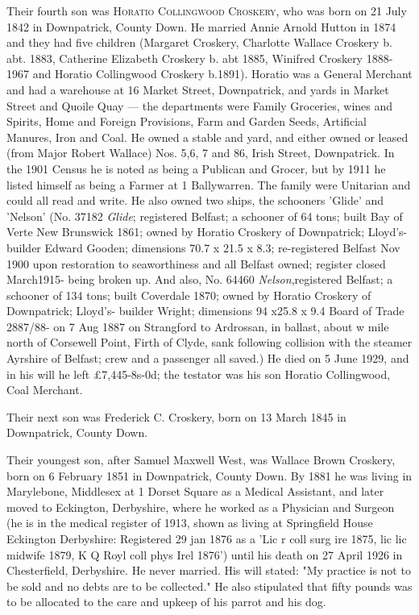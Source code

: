 Their fourth son was \textsc{Horatio Collingwood Croskery}, who was born on	21 July 1842 in Downpatrick, County Down. He married Annie Arnold Hutton in 1874 and they had five children (Margaret Croskery, Charlotte Wallace Croskery b. abt. 1883, 
Catherine Elizabeth Croskery b. abt 1885, Winifred Croskery 1888-1967 and Horatio Collingwood Croskery b.1891).  Horatio was a General Merchant and had a warehouse at 16 Market Street, Downpatrick, and yards in Market Street and Quoile Quay — the departments were Family Groceries, wines and Spirits, Home and Foreign Provisions, Farm and Garden Seeds, Artificial Manures, Iron and Coal. He owned a stable and yard, and either owned or leased (from Major Robert Wallace) Nos. 5,6, 7 and 86, Irish Street, Downpatrick. In the 1901 Census he is noted as being a Publican and Grocer, but by 1911 he listed himself as being a Farmer at 1 Ballywarren. The family were Unitarian and could all read and write. He also owned two ships, the schooners 'Glide' and 'Nelson' (No. 37182 \textit{Glide}; registered Belfast; a schooner of 64 tons; built Bay of Verte New Brunswick 1861; owned by Horatio Croskery of Downpatrick; Lloyd’s- builder Edward Gooden; dimensions 70.7 x 21.5 x 8.3; re-registered Belfast Nov 1900 upon restoration to seaworthiness and all Belfast owned; register closed March1915- being broken up. And also, No. 64460 \textit{Nelson},registered Belfast; a schooner of 134 tons; built Coverdale 1870; owned by Horatio Croskery of Downpatrick; Lloyd’s- builder Wright; dimensions 94 x25.8 x 9.4 Board of Trade 2887/88- on 7 Aug 1887 on Strangford to Ardrossan, in ballast, about w mile north of Corsewell Point, Firth of Clyde, sank following collision with the steamer Ayrshire of Belfast; crew and a passenger all saved.)   He died on 5 June 1929, and in his will he left £7,445-8s-0d; the testator was his son Horatio Collingwood, Coal Merchant. 

Their next son was Frederick C. Croskery, born on 13 March 1845 in Downpatrick, County Down.

Their youngest son, after Samuel Maxwell West, was Wallace Brown Croskery, born on 6 February 1851 in Downpatrick, County Down.  By 1881 he was living in Marylebone, Middlesex at 1 Dorset Square as a Medical Assistant, and later moved to Eckington, Derbyshire, where he worked as a Physician and Surgeon  (he is in the medical register of 1913, shown as living at Springfield House Eckington Derbyshire: Registered 29 jan 1876 as a 'Lic r coll surg ire 1875, lic lic midwife 1879, K Q Royl coll phys Irel 1876') until his death on 27 April 1926 in Chesterfield, Derbyshire. He never married.  His will stated: "My practice is not to be sold and no debts are to be collected." He also stipulated that fifty pounds was to be allocated to the care and upkeep of his parrot and his dog.






    



